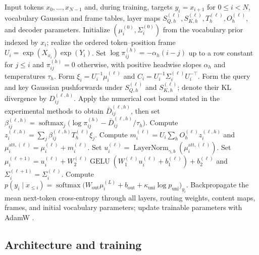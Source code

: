 \documentclass[twoside,11pt]{article}
\begin{document}
\begin{algorithm}[t]
\caption{Causal Gaussian attention and supervised predictive learning}
\label{alg:predictive_content_current}
\begin{algorithmic}[1]
\REQUIRE Input tokens $x_0,\ldots,x_{N-1}$ and, during training, targets $y_i=x_{i+1}$ for $0\le i<N$, vocabulary Gaussian and frame tables, layer maps $S_{Q,h}^{(\ell)},S_{K,h}^{(\ell)},T_h^{(\ell)},O_h^{(\ell)}$, and decoder parameters.
\STATE Initialize $(\mu_i^{(0)},\Sigma_i^{(0)})$ from the vocabulary prior indexed by $x_i$; realize the ordered token--position frame $U_i=\exp(X_{x_i})\exp(Y_i)$.
\STATE Set $\log\pi_{ij}^{(h)}=-\alpha_h(i-j)$ up to a row constant for $j\le i$ and $\pi_{ij}^{(h)}=0$ otherwise, with positive headwise slopes $\alpha_h$ and temperatures $\tau_h$.
\STATE Form $\xi_i=U_i^{-1}\mu_i^{(\ell)}$ and $C_i=U_i^{-1}\Sigma_i^{(\ell)}U_i^{-\top}$.
\STATE Form the query and key Gaussian pushforwards under $S_{Q,h}^{(\ell)}$ and $S_{K,h}^{(\ell)}$; denote their KL divergence by $D_{ij}^{(\ell,h)}$.
\STATE Apply the numerical cost bound stated in the experimental methods to obtain $\bar D_{ij}^{(\ell,h)}$, then set $\beta_{ij}^{(\ell,h)}=\operatorname{softmax}_{j}\bigl(\log\pi_{ij}^{(h)}-\bar D_{ij}^{(\ell,h)}/\tau_h\bigr)$.
\STATE Compute $z_i^{(\ell,h)}=\sum_j\beta_{ij}^{(\ell,h)}T_h^{(\ell)}\xi_j$.
\ENDFOR
\STATE Compute $m_i^{(\ell)}=U_i\sum_h O_h^{(\ell)}z_i^{(\ell,h)}$ and $\mu_i^{\mathrm{att},(\ell)}=\mu_i^{(\ell)}+m_i^{(\ell)}$.
\STATE Set $u_i^{(\ell)}=\operatorname{LayerNorm}_{\gamma,b}(\mu_i^{\mathrm{att},(\ell)})$.
\STATE Set $\mu_i^{(\ell+1)}=u_i^{(\ell)}+W_2^{(\ell)}\operatorname{GELU}(W_1^{(\ell)}u_i^{(\ell)}+b_1^{(\ell)})+b_2^{(\ell)}$ and $\Sigma_i^{(\ell+1)}=\Sigma_i^{(\ell)}$.
\ENDFOR
\STATE Compute $p(y_i\mid x_{\le i})=\operatorname{softmax}\bigl(W_{\mathrm{out}}\mu_i^{(L)}+b_{\mathrm{out}}+\kappa_{\mathrm{uni}}\log p_{\mathrm{uni}}\bigr)_{y_i}$.
\STATE Backpropagate the mean next-token cross-entropy through all layers, routing weights, content maps, frames, and initial vocabulary parameters; update trainable parameters with AdamW \citep{Loshchilov2019AdamW}.
\ENDIF
\end{algorithmic}
\end{algorithm}
\FloatBarrier

\subsection{Architecture and training}
\label{sec:relational_run}
\end{document}
